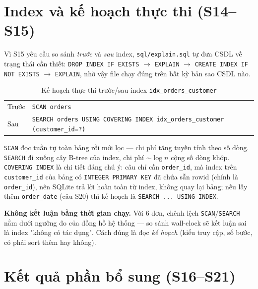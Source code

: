 \documentclass[10pt,a4paper,twocolumn]{article}
\newcommand{\code}[1]{\texttt{\small #1}}
\begin{document}
\section{Index và kế hoạch thực thi (S14--S15)}

Vì S15 yêu cầu so sánh \emph{trước} và \emph{sau} index, \code{sql/explain.sql} tự đưa CSDL về
trạng thái cần thiết: \code{DROP INDEX IF EXISTS} $\rightarrow$ \code{EXPLAIN} $\rightarrow$
\code{CREATE INDEX IF NOT EXISTS} $\rightarrow$ \code{EXPLAIN}, nhờ vậy file chạy đúng trên bất kỳ
bản sao CSDL nào.

\begin{table}[H]
\centering
\caption{Kế hoạch thực thi trước/sau index \code{idx\_orders\_customer}}
\label{tab:explain}
\scriptsize
\begin{tabularx}{\linewidth}{@{}l X@{}}
\toprule
Trước & \code{SCAN orders} \\
Sau & \code{SEARCH orders USING COVERING INDEX idx\_orders\_customer (customer\_id=?)} \\
\bottomrule
\end{tabularx}
\end{table}

\code{SCAN} đọc tuần tự toàn bảng rồi mới lọc --- chi phí tăng tuyến tính theo số dòng.
\code{SEARCH} đi xuống cây B-tree của index, chi phí $\sim\log n$ cộng số dòng khớp.
\code{COVERING INDEX} là chi tiết đáng chú ý: câu chỉ cần \code{order\_id}, mà index trên
\code{customer\_id} của bảng có \code{INTEGER PRIMARY KEY} đã chứa sẵn rowid (chính là
\code{order\_id}), nên SQLite trả lời hoàn toàn từ index, không quay lại bảng; nếu lấy thêm
\code{order\_date} (câu S20) thì kế hoạch là \code{SEARCH ... USING INDEX}.

\textbf{Không kết luận bằng thời gian chạy.} Với 6 đơn, chênh lệch \code{SCAN}/\code{SEARCH} nằm
dưới ngưỡng đo của đồng hồ hệ thống --- so sánh wall-clock sẽ kết luận sai là index "không có tác
dụng". Cách đúng là đọc \emph{kế hoạch} (kiểu truy cập, số bước, có phải sort thêm hay không).

\section{Kết quả phần bổ sung (S16--S21)}
\end{document}
